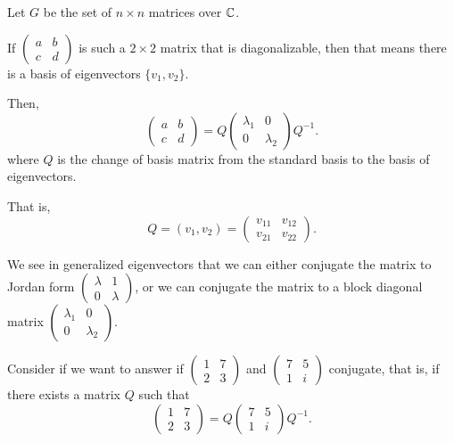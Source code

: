 \begin{example}
    Let $G$ be the set of $n \times n$ matrices over $\mathbb{C}$.

    If $\begin{pmatrix} a & b \\ c & d \end{pmatrix}$ is such a $2 \times 2$ matrix that is diagonalizable, then that means there is a basis of eigenvectors $\{ v_1, v_2 \}$.

    Then, \[
        \begin{pmatrix} a & b \\ c & d \end{pmatrix} = Q \begin{pmatrix} \lambda_1 & 0 \\ 0 & \lambda_2 \end{pmatrix} Q^{-1}.
    \] where $Q$ is the change of basis matrix from the standard basis to the basis of eigenvectors.

    That is, \[
        Q = (v_1, v_2) = \begin{pmatrix} v_{11} & v_{12} \\ v_{21} & v_{22} \end{pmatrix}.
    \]

    We see in generalized eigenvectors that we can either conjugate the matrix to Jordan form $\begin{pmatrix} \lambda & 1 \\ 0 & \lambda \end{pmatrix}$, or we can conjugate the matrix to a block diagonal matrix $\begin{pmatrix} \lambda_1 & 0 \\ 0 & \lambda_2 \end{pmatrix}$.

    Consider if we want to answer if $\begin{pmatrix} 1 & 7 \\ 2 & 3 \end{pmatrix}$ and $\begin{pmatrix} 7 & 5 \\ 1 & i \end{pmatrix}$ conjugate, that is, if there exists a matrix $Q$ such that \[
        \begin{pmatrix} 1 & 7 \\ 2 & 3 \end{pmatrix} = Q \begin{pmatrix} 7 & 5 \\ 1 & i \end{pmatrix} Q^{-1}.
    \]


\end{example}
